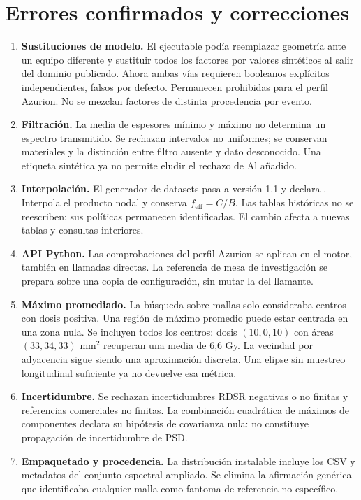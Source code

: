 \section{Errores confirmados y correcciones}
\begin{enumerate}
\item \textbf{Sustituciones de modelo.} El ejecutable podía reemplazar geometría ante un equipo diferente y sustituir todos los factores por valores sintéticos al salir del dominio publicado. Ahora ambas vías requieren booleanos explícitos independientes, falsos por defecto. Permanecen prohibidas para el perfil Azurion. No se mezclan factores de distinta procedencia por evento.
\item \textbf{Filtración.} La media de espesores mínimo y máximo no determina un espectro transmitido. Se rechazan intervalos no uniformes; se conservan materiales y la distinción entre filtro ausente y dato desconocido. Una etiqueta sintética ya no permite eludir el rechazo de Al añadido.
\item \textbf{Interpolación.} El generador de datasets pasa a versión 1.1 y declara . Interpola el producto nodal y conserva $f_{\mathrm{eff}}=C/B$. Las tablas históricas no se reescriben; sus políticas permanecen identificadas. El cambio afecta a nuevas tablas y consultas interiores.
\item \textbf{API Python.} Las comprobaciones del perfil Azurion se aplican en el motor, también en llamadas directas. La referencia de mesa de investigación se prepara sobre una copia de configuración, sin mutar la del llamante.
\item \textbf{Máximo promediado.} La búsqueda sobre mallas solo consideraba centros con dosis positiva. Una región de máximo promedio puede estar centrada en una zona nula. Se incluyen todos los centros: dosis $(10,0,10)$ con áreas $(33,34,33)$ mm$^2$ recuperan una media de 6,6 Gy. La vecindad por adyacencia sigue siendo una aproximación discreta. Una elipse sin muestreo longitudinal suficiente ya no devuelve esa métrica.
\item \textbf{Incertidumbre.} Se rechazan incertidumbres RDSR negativas o no finitas y referencias comerciales no finitas. La combinación cuadrática de máximos de componentes declara su hipótesis de covarianza nula: no constituye propagación de incertidumbre de PSD.
\item \textbf{Empaquetado y procedencia.} La distribución instalable incluye los CSV y metadatos del conjunto espectral ampliado. Se elimina la afirmación genérica que identificaba cualquier malla como fantoma de referencia no específico.
\end{enumerate}

